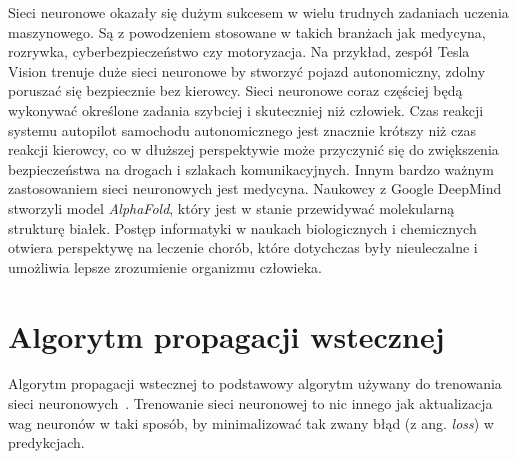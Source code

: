 Sieci neuronowe okazały się dużym sukcesem w wielu trudnych zadaniach uczenia maszynowego.
Są z powodzeniem stosowane w takich branżach jak medycyna, rozrywka, cyberbezpieczeństwo czy motoryzacja.
Na przykład, zespół Tesla Vision trenuje duże sieci neuronowe by stworzyć pojazd autonomiczny, zdolny poruszać się bezpiecznie bez kierowcy.
Sieci neuronowe coraz częściej będą wykonywać określone zadania szybciej i skuteczniej niż człowiek.
Czas reakcji systemu autopilot samochodu autonomicznego jest znacznie krótszy niż czas reakcji kierowcy, co w dłuższej perspektywie może przyczynić się do zwiększenia bezpieczeństwa na drogach i szlakach komunikacyjnych.
Innym bardzo ważnym zastosowaniem sieci neuronowych jest medycyna.
Naukowcy z Google DeepMind stworzyli model \textit{AlphaFold}, który jest w stanie przewidywać molekularną strukturę białek.
Postęp informatyki w naukach biologicznych i chemicznych otwiera perspektywę na leczenie chorób, które dotychczas były nieuleczalne i umożliwia lepsze zrozumienie organizmu człowieka.


\section{Algorytm propagacji wstecznej}

Algorytm propagacji wstecznej to podstawowy algorytm używany do trenowania sieci neuronowych~\cite{geron}.
Trenowanie sieci neuronowej to nic innego jak aktualizacja wag neuronów w taki sposób, by minimalizować tak zwany błąd (z ang. \textit{loss}) w predykcjach.


